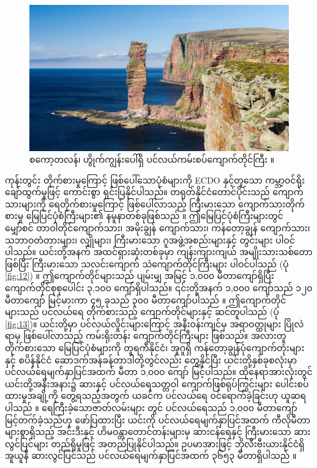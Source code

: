 \documentclass[10pt,twocolumn,letterpaper]{article}
\begin{document}
\begin{figure}[b]
\begin{center}
   \includegraphics[width=1\linewidth]{hoy.jpg}
\end{center}
   \caption{စကော့တလန်၊ ဟွိုက်ကျွန်းပေါ်ရှိ ပင်လယ်ကမ်းစပ်ကျောက်တိုင်ကြီး \cite{83}။}
\label{fig:13}
\label{fig:onecol}
\end{figure}

ကုန်းတွင်း တိုက်စားမှုကြောင့် ဖြစ်ပေါ်သောပုံစံများကို ECDO နှင့်တူသော ကမ္ဘာ့ဝင်ရိုး ချော်ထွက်မှုဖြင့် ကောင်းစွာ ရှင်းပြနိုင်ပါသည်။ တရုတ်နိုင်ငံတောင်ပိုင်းသည် ကျောက်သားများကို ရေတိုက်စားမှုကြောင့် ဖြစ်ပေါ်လာသည့် ကြီးမားသော ကျောက်သားတိုက်စားမှု မြေပြင်ပုံစံကြီးများ၏ နမူနာတစ်ခုဖြစ်သည် \cite{82}။ ဤမြေပြင်ပုံစံကြီးများတွင် မျှော်စင် တာဝါတိုင်ကျောက်သား၊ အမိုးချွန် ကျောက်သား၊ ကန်တော့ချွန် ကျောက်သား၊ သဘာဝတံတားများ၊ လျှိုများ၊ ကြီးမားသော ဂူအဖွဲ့အစည်းများနှင့် တွင်းများ ပါဝင်ပါသည်။ ယင်းတို့အနက် အထင်ရှားဆုံးတစ်ခုမှာ ကျန်းကျားကျယ် အမျိုးသားသစ်တောဖြစ်ပြီး ကြီးမားသော သလင်းကျောက် သဲကျောက်တိုင်ကြီးများ ပါဝင်ပါသည် (ပုံ \ref{fig:12}) \cite{84}။ ဤကျောက်တိုင်များသည် ပျမ်းမျှ အမြင့် ၁,၀၀၀ မီတာကျော်ရှိပြီး ကျောက်တိုင်စုစုပေါင်း ၃,၁၀၀ ကျော်ရှိပါသည်။ ၎င်းတို့အနက် ၁,၀၀၀ ကျော်သည် ၁၂၀ မီတာကျော် မြင့်မားကာ ၄၅ ခုသည် ၃၀၀ မီတာကျော်ပါသည် \cite{85}။ ဤကျောက်တိုင်များသည် ပင်လယ်ရေ တိုက်စားသည့် ကျောက်တိုင်များနှင့် ဆင်တူပါသည် (ပုံ \ref{fig:13})။ ယင်းတို့မှာ ပင်လယ်လှိုင်းများကြောင့် အနီးဝန်းကျင်မှ အရာဝတ္ထုများ ပြိုလဲရာမှ ဖြစ်ပေါ်လာသည့် ကမ်းရိုးတန်း ကျောက်တိုင်ကြီးများ ဖြစ်သည်။ အလားတူ တိုက်စားသော မြေပြင်ပုံစံများကို တူရကီနိုင်ငံ၊ အူဂူရှိ ကန်တော့ချွန်ပုံကျောက်တုံးများနှင့် စပိန်နိုင်ငံ ဆောဒက်အန်ခန်တာဒါတို့တွင်လည်း တွေ့နိုင်ပြီး ယင်းတို့နှစ်ခုစလုံးမှာ ပင်လယ်ရေမျက်နှာပြင်အထက် မီတာ ၁,၀၀၀ ကျော် မြင့်ပါသည်။ ထိုနေရာအားလုံးတွင် ယင်းတို့အနီးအနား၌ ဆားနှင့် ပင်လယ်ရေသတ္တဝါ ကျောက်ဖြစ်ရုပ်ကြွင်းများ ပေါင်းစပ်ထားမှုအချို့ကို တွေ့ရသည့်အတွက် ယခင်က ပင်လယ်ရေ ဝင်ရောက်ခဲ့ခြင်းဟု ယူဆရပါသည် \cite{15,86,87}။ ရေကြီးခဲ့သောဇာတ်လမ်းများ \cite{3} တွင် ပင်လယ်ရေသည် ၁,၀၀၀ မီတာကျော် မြင့်တက်ခဲ့သည်ဟု ဖော်ပြထားပြီး ယင်းကို ပင်လယ်ရေမျက်နှာပြင်အထက် ကီလိုမီတာများစွာရှိသည့် အင်းဒီးနှင့် ဟိမဝန္တာတောင်တန်းများမှ ဆားငန်ရေနှင့် ကြီးမားသော ဆားလွင်ပြင်များ တည်ရှိမှုဖြင့် အတည်ပြုနိုင်ပါသည်။ ဥပမာအားဖြင့် ဘိုလီးဗီးယားနိုင်ငံရှိ အူယူနီ ဆားလွင်ပြင်သည် ပင်လယ်ရေမျက်နှာပြင်အထက် ၃၆၅၃ မီတာရှိပါသည် \cite{94}။
\end{document}
